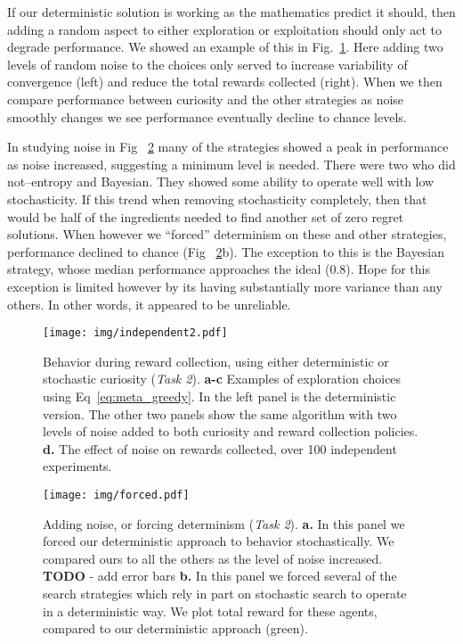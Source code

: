 If our deterministic solution is working as the mathematics predict it should,  then adding a random aspect to either exploration or exploitation should only act to degrade performance. We showed an example of this in Fig.~\ref{fig:independent2}. Here adding two levels of random noise to the choices only served to increase variability of convergence (left) and reduce the total rewards collected (right). When we then compare performance between curiosity and the other strategies as noise smoothly changes we see performance eventually decline to chance levels. 

In studying noise in Fig ~\ref{fig:forced} many of the strategies showed a peak in performance as noise increased, suggesting a minimum level is needed. There were two who did not--entropy and Bayesian. They showed some ability to operate well with low stochasticity. If this trend when removing stochasticity completely, then that would be half of the ingredients needed to find another set of zero regret solutions. When however we ``forced'' determinism on these and other strategies, performance declined to chance (Fig ~\ref{fig:forced}b). The exception to this is the Bayesian strategy, whose median performance approaches the ideal (0.8). Hope for this exception is limited however by its having substantially more variance than any others. In other words, it appeared to be unreliable.

\begin{figure}
	\begin{fullwidth}
	\texttt{[image: img/independent2.pdf]} 
	\caption{Behavior during reward collection, using either deterministic or stochastic curiosity (\textit{Task 2}). 
	\textbf{a-c} Examples of exploration choices using Eq~\ref{eq:meta_greedy}. In the left panel is the deterministic version. The other two panels show the same algorithm with two levels of noise added to both curiosity and reward collection policies. 
	\textbf{d.} The effect of noise on rewards collected, over 100 independent experiments.}
	\label{fig:independent2}
	\end{fullwidth}
\end{figure}

\begin{figure}
	\begin{fullwidth}
	\texttt{[image: img/forced.pdf]} 
	\caption{Adding noise, or forcing determinism (\textit{Task 2}). 
	\textbf{a.} In this panel we forced our deterministic approach to behavior stochastically. We compared ours to all the others as the level of noise increased. \textbf{TODO} - add error bars
	\textbf{b.} In this panel we forced several of the search strategies which rely in part on stochastic search to operate in a deterministic way. We plot total reward for these agents, compared to our deterministic approach (green).
	}
	\label{fig:forced}
	\end{fullwidth}
\end{figure}



